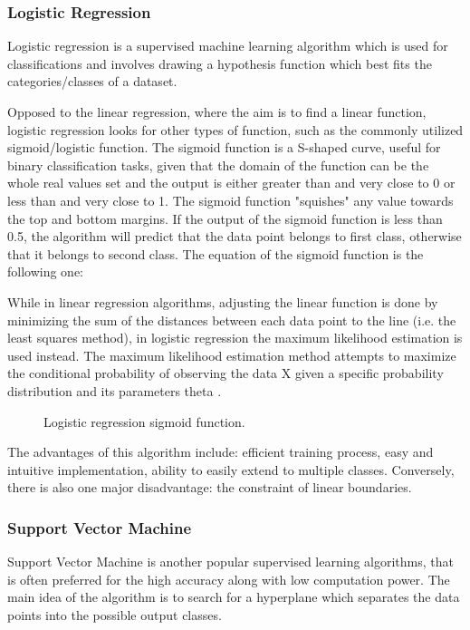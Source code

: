 \subsubsection{Logistic Regression}
Logistic regression is a supervised machine learning algorithm which is used for classifications and involves drawing a hypothesis function which best fits the categories/classes of a dataset. 

Opposed to the linear regression, where the aim is to find a linear function, logistic regression looks for other types of function, such as the commonly utilized sigmoid/logistic function. The sigmoid function is a S-shaped curve, useful for binary classification tasks, given that the domain of the function can be the whole real values set and the output is either greater than and very close to 0 or less than and very close to 1. The sigmoid function "squishes" any value towards the top and bottom margins. If the output of the sigmoid function is less than 0.5, the algorithm will predict that the data point belongs to first class, otherwise that it belongs to second class. The equation of the sigmoid function is the following one:

While in linear regression algorithms, adjusting the linear function is done by minimizing the sum of the distances between each data point to the line (i.e. the least squares method), in logistic regression the maximum likelihood estimation is used instead. The maximum likelihood estimation method attempts to maximize the conditional probability of observing the data X given a specific probability distribution and its parameters theta \cite{log_reg}.

\begin{figure}[H]
  \centering
  \caption{Logistic regression sigmoid function.}
\end{figure}

The advantages of this algorithm include: efficient training process, easy and intuitive implementation, ability to easily extend to multiple classes. Conversely, there is also one major disadvantage: the constraint of linear boundaries.

\subsubsection{Support Vector Machine}
Support Vector Machine is another popular supervised learning algorithms, that is often preferred for the high accuracy along with low computation power. The main idea of the algorithm is to search for a hyperplane which separates the data points into the possible output classes.

